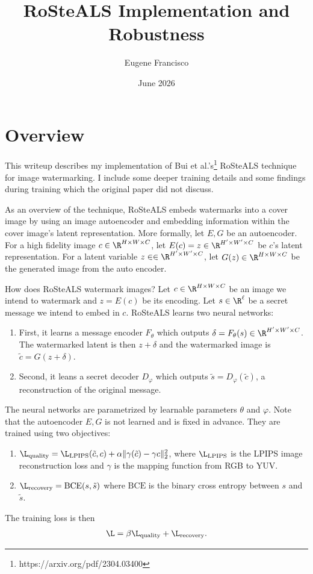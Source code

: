 \documentclass[twocolumn]{article}
\title{RoSteALS Implementation and Robustness}
\author{Eugene Francisco}
\date{June 2026}
\begin{document}
\maketitle
\section*{Overview}
This writeup describes my implementation of Bui et al.'s\footnote{https://arxiv.org/pdf/2304.03400} RoSteALS technique for image watermarking. I include some deeper training details and some findings during training which the original paper did not discuss.

As an overview of the technique, RoSteALS embeds watermarks into a cover image by using an image autoencoder and embedding information within the cover image's latent representation. More formally, let $E, G$ be an autoencoder. For a high fidelity image $c\in \R^{H\times W\times C}$, let $E(c) = z\in \R^{H'\times W'\times C}$ be $c$'s latent representation. For a latent variable $z\in \in \R^{H'\times W'\times C}$, let $G(z)\in \R^{H\times W\times C}$ be the generated image from the auto encoder.

How does RoSteALS watermark images? Let $c\in \R^{H\times W\times C}$ be an image we intend to watermark and $z = E(c)$ be its encoding. Let $s\in \R^\ell$ be a secret message we intend to embed in $c$. RoSteALS learns two neural networks:
\begin{enumerate}[label=(\roman*)]
\item First, it 	learns a message encoder $F_\theta$ which outputs $\delta = F_\theta(s) \in \R^{H' \times W'\times C}$. The watermarked latent is then $z + \delta$ and the watermarked image is $\tilde c = G(z + \delta)$.
\item Second, it leans a secret decoder $D_\varphi$ which outputs $\tilde s = D_\varphi(\tilde c)$, a reconstruction of the original message.
\end{enumerate}
The neural networks are parametrized by learnable parameters $\theta$ and $\varphi$. Note that the autoencoder $E, G$ is not learned and is fixed in advance. They are trained using two objectives:
\begin{enumerate}[label=(\alph*)]
\item $\L_{\mathrm{quality}} = \L_{\mathrm{LPIPS}}(\tilde c, c) + \alpha \Vert \gamma(\tilde c) - \gamma{c}\Vert_2^2$, where $\L_{\mathrm{LPIPS}}$ is the LPIPS image reconstruction loss and $\gamma$ is the mapping function from RGB to YUV.
\item $\L_{\mathrm{recovery}} = \mathrm{BCE}(s, \tilde s)$ where $\mathrm{BCE}$ is the binary cross entropy between $s$ and $\tilde s$.
\end{enumerate}
The training loss is then
\begin{align*}
	\L = \beta\L_{\mathrm{quality}} + \L_{\text{recovery}}.
\end{align*}
\end{document}
